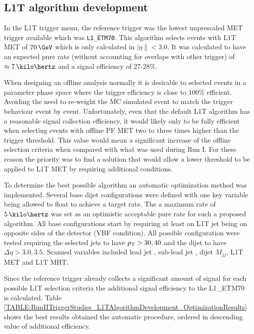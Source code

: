 \subsection{L1T algorithm development}
\label{SECTION:RunIITriggerStudies_L1TAlgorithmDevelopment}


In the \gls{L1T} trigger menu, the reference trigger was the lowest unprescaled \gls{MET} trigger available which was \verb|L1_ETM70|. This algorithm selects events with \gls{L1T} \gls{MET} of $70\,\GeV$ which is only calculated in $|\eta\|<3.0$. It was calculated to have an expected pure rate (without accounting for overlaps with other trigger) of $\approx 7\,\kilo\hertz$ and a signal efficiency of 27-28\%. 

When designing an offline analysis normally it is desirable to selected events in a parameter phase space where the trigger efficiency is close to 100\% efficient. Avoiding the need to re-weight the \gls{MC} simulated event to match the trigger behaviour event by event. Unfortunately, even that the default \gls{L1T} algorithm has a reasonable signal collection efficiency, it would likely only to be fully efficient when selecting events with offline \gls{PF} \gls{MET} two to three times higher than the trigger threshold. This value would mean a significant increase of the offline selection criteria when compared with what was used during Run I. For these reason the priority was to find a solution that would allow a lower threshold to be applied to \gls{L1T} \gls{MET} by requiring additional conditions.

To determine the best possible algorithm an automatic optimization method was implemented. Several base dijet configurations were defined with one key variable being allowed to float to achieve a target rate. The a maximum rate of $5\,\kilo\hertz$ was set as an optimistic acceptable pure rate for such a proposed algorithm. All base configurations start by requiring at least on \gls{L1T} jet being on opposite sides of the detector (\gls{VBF} condition). All possible configuration were tested requiring the selected jets to have $p_{\mathrm{T}}>{30,40}$ and the dijet to have $\Delta\eta>{3.0,3.5}$. Scanned variables included lead jet \pt, sub-lead jet \pt, dijet $M_{jj}$, \gls{L1T} \gls{MET} and \gls{L1T} \gls{MHT}. 

Since the reference trigger already collects a significant amount of signal for each possible \gls{L1T} selection criteria the additional signal efficiency to the L1\_ETM70 is calculated. Table \ref{TABLE:RunIITriggerStudies_L1TAlgorithmDevelopment_OptimizationResults} shows the best results obtained the automatic procedure, ordered in descending value of additional efficiency.


